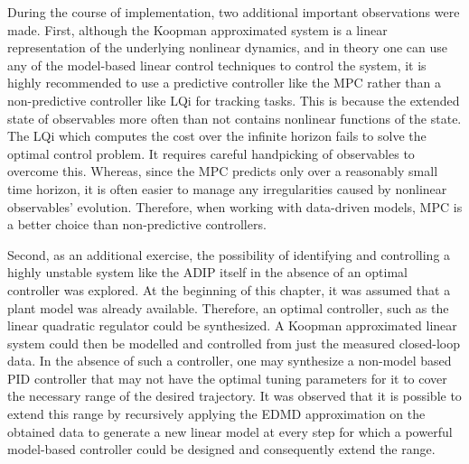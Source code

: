 During the course of implementation, two additional important observations were made. First, although the Koopman approximated system is a linear representation of the underlying nonlinear dynamics, and in theory one can use any of the model-based linear control techniques to control the system, it is highly recommended to use a predictive controller like the MPC rather than a non-predictive controller like LQi for tracking tasks. This is because the extended state of observables more often than not contains nonlinear functions of the state. The LQi which computes the cost over the infinite horizon fails to solve the optimal control problem. It requires careful handpicking of observables to overcome this. Whereas, since the MPC predicts only over a reasonably small time horizon, it is often easier to manage any irregularities caused by nonlinear observables' evolution. Therefore, when working with data-driven models, MPC is a better choice than non-predictive controllers.\par
Second, as an additional exercise, the possibility of identifying and controlling a highly unstable system like the ADIP itself in the absence of an optimal controller was explored. At the beginning of this chapter, it was assumed that a plant model was already available. Therefore, an optimal controller, such as the linear quadratic regulator could be synthesized. A Koopman approximated linear system could then be modelled and controlled from just the measured closed-loop data. In the absence of such a controller, one may synthesize a non-model based PID controller that may not have the optimal tuning parameters for it to cover the necessary range of the desired trajectory. It was observed that it is possible to extend this range by recursively applying the EDMD approximation on the obtained data to generate a new linear model at every step for which a powerful model-based controller could be designed and consequently extend the range.\par
